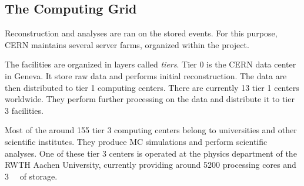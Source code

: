 \subsection{The Computing Grid}
Reconstruction and analyses are ran on the stored events. For this purpose, \ac{CERN} maintains several server farms, organized within the  project.

The facilities are organized in layers called \emph{tiers}. Tier 0 is the \ac{CERN} data center in Geneva. It store raw data and performs initial reconstruction. The data are then distributed to tier 1 computing centers. There are currently 13 tier 1 centers worldwide. They perform further processing on the data and distribute it to tier 3 facilities.

Most of the around 155 tier 3 computing centers belong to universities and other scientific institutes\cite{CERN:Gridsystemtiers}. They produce \ac{MC} simulations and perform scientific analyses. One of these tier 3 centers is operated at the physics department of the RWTH Aachen University, currently providing around \num{5200} processing cores and \SI{3}{\peta\byte} of storage\cite{UniRWTHAachenIII.PhysikalischesInstitut:GridComputing}. 
